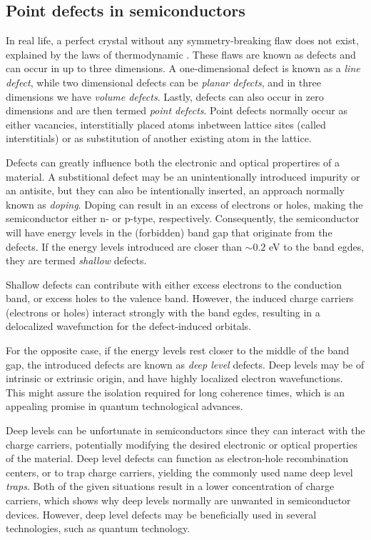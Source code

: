 \subsection{Point defects in semiconductors}

In real life, a perfect crystal without any symmetry-breaking flaw does not exist, explained by the laws of thermodynamic \cite{CharlesKittel2012}. These flaws are known as defects and can occur in up to three dimensions. A one-dimensional defect is known as a \textit{line defect}, while two dimensional defects can be \textit{planar defects}, and in three dimensions we have \textit{volume defects}. Lastly, defects can also occur in zero dimensions and are then termed \textit{point defects}. Point defects normally occur as either vacancies, interstitially placed atoms inbetween lattice sites (called interstitials) or as substitution of another existing atom in the lattice.

Defects can greatly influence both the electronic and optical propertires of a material. A substitional defect may be an unintentionally introduced impurity or an antisite, but they can also be intentionally inserted, an approach normally known as \textit{doping}. Doping can result in an excess of electrons or holes, making the semiconductor either n- or p-type, respectively. Consequently, the semiconductor will have energy levels in the (forbidden) band gap that originate from the defects. If the energy levels introduced are closer than $ \sim 0.2$ eV to the band egdes, they are termed \textit{shallow} defects.

Shallow defects can contribute with either excess electrons to the conduction band, or excess holes to the valence band. However, the induced charge carriers (electrons or holes) interact strongly with the band egdes, resulting in a delocalized wavefunction for the defect-induced orbitals.%

For the opposite case, if the energy levels rest closer to the middle of the band gap, the introduced defects are known as \textit{deep level} defects. Deep levels may be of intrinsic or extrinsic origin, %
and have highly localized electron wavefunctions. This might assure the isolation required for long coherence times, which is an appealing promise in quantum technological advances.

Deep levels can be unfortunate in semiconductors since they can interact with the charge carriers, potentially modifying the desired electronic or optical properties of the material. Deep level defects can function as electron-hole recombination centers, or to trap charge carriers, yielding the commonly used name deep level \textit{traps}. Both of the given situations result in a lower concentration of charge carriers, which shows why deep levels normally are unwanted in semiconductor devices. %
However, deep level defects may be beneficially used in several technologies, such as quantum technology. %

